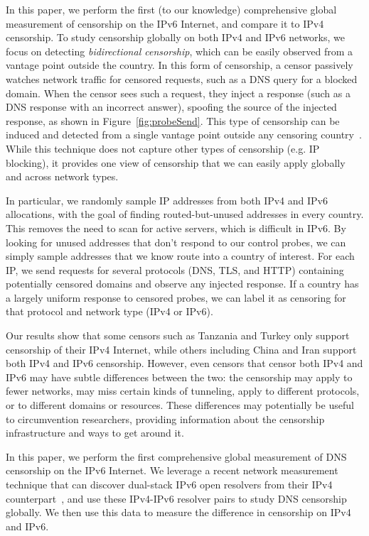 In this paper, we perform the first (to our knowledge) comprehensive global measurement of
censorship on the IPv6 Internet, and compare it to IPv4 censorship.
To study censorship globally on both IPv4 and IPv6 networks, we focus on
detecting \emph{bidirectional censorship}, which can be easily observed from a
vantage point outside the country. In this form of censorship, a censor
passively watches network traffic for censored requests, such as a DNS query
for a blocked domain. When the censor sees such a request, they inject a response (such as a DNS
response with an incorrect answer), spoofing the source of the injected
response,
as shown in Figure~\ref{fig:probeSend}.
This type of censorship can be induced and detected from a single
vantage point outside any censoring
country~\cite{vandersloot2018quack,collateral-dns,pearce2017global,scott2016satellite}.
While this technique does not capture other types of censorship (e.g. IP
blocking), it provides one view
of censorship that we can easily apply globally and across network types.

In particular, we randomly sample IP addresses from both IPv4 and IPv6
allocations, with the goal of finding routed-but-unused addresses in every
country. This removes the need to scan for active servers, which is difficult in
IPv6. By looking for unused addresses that don't respond to our control probes,
we can simply sample addresses that we know route into a country of interest.
%
For each IP, we send requests for several protocols (DNS, TLS, and HTTP)
containing potentially censored domains and observe any injected response. If a
country has a largely uniform response to censored probes, we can label it as
censoring for that protocol and network type (IPv4 or IPv6).

\medskip
Our results show that
some censors such as Tanzania and Turkey only support censorship of
their IPv4 Internet,
while others including China and Iran support both IPv4 and IPv6 censorship.
However, even censors that censor both IPv4 and IPv6 may have subtle differences
between the two: the censorship may apply to fewer networks, may miss certain
kinds of tunneling, apply to different
protocols, or to different domains or resources. These differences may
potentially be useful to circumvention researchers, providing information about
the censorship infrastructure and ways to get around it.


In this paper, we perform the first comprehensive global measurement of DNS
censorship on the IPv6 Internet. We leverage a recent network measurement
technique that can discover dual-stack IPv6 open resolvers from their IPv4
counterpart~\cite{hendriks2017potential}, and use these IPv4-IPv6 resolver pairs
to study DNS censorship globally. %
We then use this data to measure the difference in censorship on IPv4 and IPv6.


